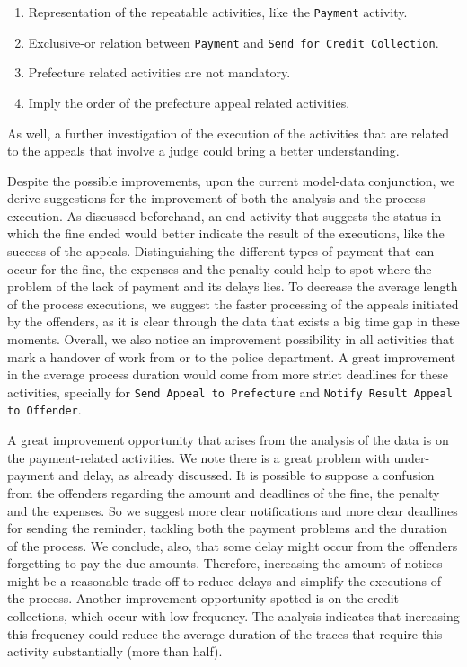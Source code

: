 \documentclass[12pt]{report}
\begin{document}
\begin{enumerate}
    \item Representation of the repeatable activities, like the \texttt{Payment} activity.
    \item Exclusive-or relation between \texttt{Payment} and \texttt{Send for Credit Collection}.
    \item Prefecture related activities are not mandatory.
    \item Imply the order of the prefecture appeal related activities.
\end{enumerate}

As well, a further investigation of the execution of the activities that are related to the appeals that involve a judge could bring a better understanding.

Despite the possible improvements, upon the current model-data conjunction, we derive suggestions for the improvement of both the analysis and the process execution. As discussed beforehand, an end activity that suggests the status in which the fine ended would better indicate the result of the executions, like the success of the appeals. Distinguishing the different types of payment that can occur for the fine, the expenses and the penalty could help to spot where the problem of the lack of payment and its delays lies. To decrease the average length of the process executions, we suggest the faster processing of the appeals initiated by the offenders, as it is clear through the data that exists a big time gap in these moments. Overall, we also notice an improvement possibility in all activities that mark a handover of work from or to the police department. A great improvement in the average process duration would come from more strict deadlines for these activities, specially for \texttt{Send Appeal to Prefecture} and \texttt{Notify Result Appeal to Offender}.

A great improvement opportunity that arises from the analysis of the data is on the payment-related activities. We note there is a great problem with under-payment and delay, as already discussed. It is possible to suppose a confusion from the offenders regarding the amount and deadlines of the fine, the penalty and the expenses. So we suggest more clear notifications and more clear deadlines for sending the reminder, tackling both the payment problems and the duration of the process. We conclude, also, that some delay might occur from the offenders forgetting to pay the due amounts. Therefore, increasing the amount of notices might be a reasonable trade-off to reduce delays and simplify the executions of the process. Another improvement opportunity spotted is on the credit collections, which occur with low frequency. The analysis indicates that increasing this frequency could reduce the average duration of the traces that require this activity substantially (more than half).
\end{document}
